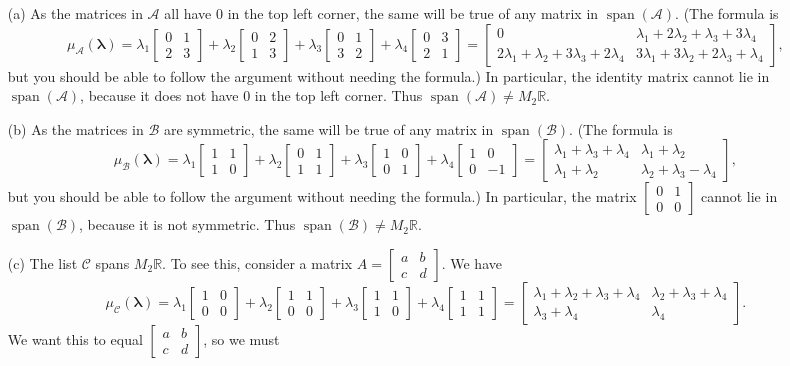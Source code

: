 \documentclass{amsart}
\newcommand{\R}         {{\mathbb{R}}}
\newcommand{\spn}       {\operatorname{span}}
\newcommand{\bsm}       {\left[\begin{smallmatrix}}
\newcommand{\esm}       {\end{smallmatrix}\right]}
\newcommand{\lm}        {\lambda}
\newcommand{\vlm}       {\mathbf{\lambda}}
\newcommand{\CA}        {{\mathcal{A}}}
\newcommand{\CB}        {{\mathcal{B}}}
\newcommand{\CC}        {{\mathcal{C}}}
\renewcommand{\:}       {\colon}
\theoremstyle{definition}
\renewenvironment{solution}{\SolutionAtEnd}{\endSolutionAtEnd}
\begin{document}
\begin{solution}
 \begin{itemize}
  \item[(a)] As the matrices in $\CA$ all have $0$ in the top
   left corner, the same will be true of any matrix in
   $\spn(\CA)$.  (The formula is
   \[ \mu_\CA(\vlm) = 
       \lm_1 \bsm 0&1\\2&3\esm +
       \lm_2 \bsm 0&2\\1&3\esm +
       \lm_3 \bsm 0&1\\3&2\esm +
       \lm_4 \bsm 0&3\\2&1\esm =
       \bsm 0 & \lm_1 + 2\lm_2 + \lm_3 + 3\lm_4 \\
            2\lm_1 + \lm_2 + 3\lm_3 + 2\lm_4 &
            3\lm_1 + 3\lm_2 + 2\lm_3 + \lm_4 \esm,
   \]
   but you should be able to follow the argument without
   needing the formula.)  In particular, the identity
   matrix cannot lie in $\spn(\CA)$, because it
   does not have $0$ in the top left corner.  Thus
   $\spn(\CA)\neq M_2\R$.
  \item[(b)] As the matrices in $\CB$ are symmetric, the
   same will be true of any matrix in $\spn(\CB)$.  (The formula is
   \[ \mu_\CB(\vlm) = 
       \lm_1 \bsm 1&1\\1&0\esm +
       \lm_2 \bsm 0&1\\1&1\esm +
       \lm_3 \bsm 1&0\\0&1\esm +
       \lm_4 \bsm 1&0\\0&-1\esm =
       \bsm \lm_1 +\lm_3+\lm_4 & \lm_1+\lm_2  \\
            \lm_1+\lm_2 & \lm_2+\lm_3-\lm_4 \esm,
   \]
   but you should be able to follow the argument without
   needing the formula.)  In particular, the matrix
   $\bsm 0&1\\0&0\esm$ cannot lie in $\spn(\CB)$, because it
   is not symmetric.  Thus $\spn(\CB)\neq M_2\R$.
  \item[(c)] The list $\CC$ spans $M_2\R$.  To see this,
   consider a matrix $A=\bsm a&b\\ c&d\esm$.  We have 
   \[ \mu_\CC(\vlm)=
       \lm_1 \bsm 1&0\\0&0\esm +
       \lm_2 \bsm 1&1\\0&0\esm +
       \lm_3 \bsm 1&1\\1&0\esm +
       \lm_4 \bsm 1&1\\1&1\esm = 
       \bsm \lm_1+\lm_2+\lm_3+\lm_4 & \lm_2+\lm_3+\lm_4 \\
            \lm_3+\lm_4 & \lm_4 \esm.
   \]
   We want this to equal $\bsm a&b \\ c&d\esm$, so we must

\end{itemize}
\end{solution}
\end{document}
